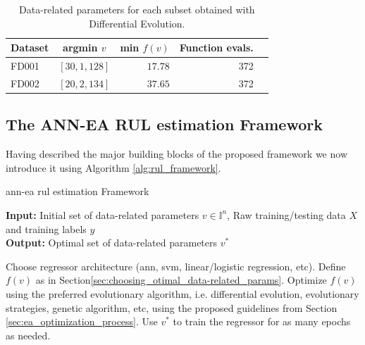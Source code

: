 \begin{table}[!htb]
\centering
\begin{tabular}{l | c r r l}
	\hline
	 Dataset & argmin $v$ & min $f(v)$ & Function evals.\\
  	\hline
  	FD001 & $\left[ 30, 1, 128 \right]$ & $17.78$ & 372\\
  	FD002 & $\left[ 20, 2, 134 \right]$ & $37.65$ & 372\\
  	\hline
\end{tabular}
\caption{Data-related parameters for each subset obtained with Differential Evolution.}
\label{table:optimal_data_params}
\end{table}

\subsection{The ANN-EA RUL estimation Framework}

Having described the major building blocks of the proposed framework we now introduce it using Algorithm \ref{alg:rul_framework}.

\setcounter{algorithm}{0}
\begin{algorithm}[H]
\caption{\gls{ann}-\gls{ea} \gls{rul} estimation Framework}\label{alg:rul_framework}
\textbf{Input:} Initial set of data-related parameters $v \in \mathbb{I}^n$, Raw training/testing data $X$ and training labels $y$\\
\textbf{Output:} Optimal set of data-related parameters $v^*$
	\begin{algorithmic}[1]
		\State Choose regressor architecture (\gls{ann}, \gls{svm}, linear/logistic regression, etc).
		\State Define $f(v)$ as in Section\ref{sec:choosing_otimal_data-related_params}.
		\State Optimize $f(v)$ using the preferred evolutionary algorithm, i.e. differential evolution, evolutionary strategies, genetic algorithm, etc, using the proposed guidelines from Section \ref{sec:ea_optimization_process}.
		\State Use $v^*$ to train the regressor for as many epochs as needed.
	\end{algorithmic}
\end{algorithm}

\pagebreak
